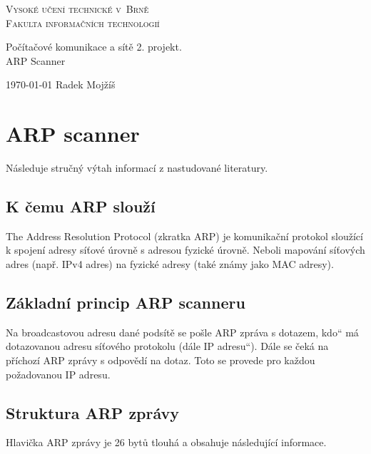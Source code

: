 \documentclass[11pt,a4paper,titlepage]{article}
\providecommand{\czq}[1]{\quotedblbase #1\textquotedblleft}
\begin{document}
\thispagestyle{empty}
\begin{center}

\textsc{
\Huge{Vysoké učení technické v~Brně \\}
\huge{Fakulta informačních technologií\\}
}
 

\LARGE{ Počítačové komunikace a sítě 2. projekt. \\}
\Huge{ARP Scanner\\}

\end{center}

\Large{\today} \hfill Radek Mojžíš

\newpage
\tableofcontents
\newpage
\setcounter{page}{1}
\newpage
\section{ARP scanner}
Následuje stručný výtah informací z nastudované literatury.
\subsection{K čemu ARP slouží}
The Address Resolution Protocol (zkratka ARP) je komunikační protokol sloužící k 
spojení adresy síťové úrovně s adresou fyzické úrovně.
Neboli mapování síťových adres (např. IPv4 adres) na fyzické adresy (také známy jako MAC adresy).
\cite{web:arp}

\subsection{Základní princip ARP scanneru}
Na broadcastovou adresu dané podsítě se pošle ARP zpráva s dotazem, \czq{kdo} má dotazovanou adresu 
síťového protokolu (dále \czq{IP adresu}). Dále se čeká na příchozí ARP zprávy
s odpovědí na dotaz. Toto se provede pro každou požadovanou IP adresu.

\subsection{Struktura ARP zprávy}
Hlavička ARP zprávy je 26 bytů tlouhá a obsahuje následující informace. \cite{web:arp}
\end{document}
